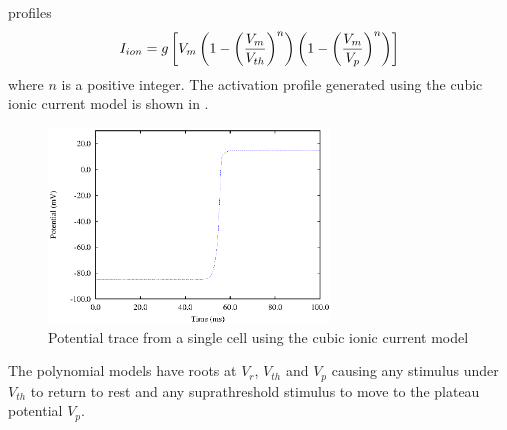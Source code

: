 profiles
\begin{equation}
  I_{ion} = g \left[  V_m \left(  1 - \left( \dfrac{V_m}{V_{th}} \right)^n \right)
  \left(  1 - \left( \dfrac{V_m}{V_p} \right)^n \right) \right]
  \label{eqn:cubic_ionic_current_model2}
\end{equation}
where $n$ is a positive integer. The activation profile generated using the
cubic ionic current model is shown in .
\begin{figure}[hbtp] 
  \centering
  \includegraphics[width=75mm]{cardiac_electrophysiology/epsfiles/CubicVm.eps}
  \caption[Potential trace from a single cell using the cubic ionic current
  model]{Potential trace from a single cell using the cubic ionic current
    model}
  \label{fig:cubic_cell_traces}
\end{figure}
The polynomial models have roots at $V_r$, $V_{th}$ and $V_p$ causing any
stimulus under $V_{th}$ to return to rest and any suprathreshold stimulus to
move to the plateau potential $V_p$.
%
